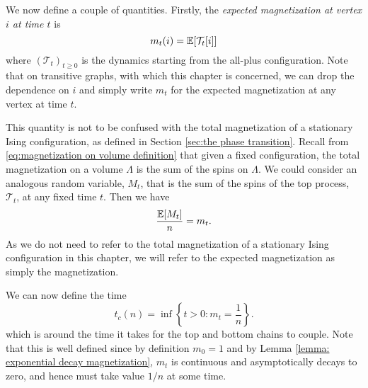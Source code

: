 We now define a couple of quantities. 
%
%
Firstly, the \emph{expected magnetization at vertex $i$ at time $t$} is
\begin{equation}
	 	m_t(i) = \mathbb{E}[\mathcal{T}_t[i]]
\end{equation} 
where $(\mathcal{T}_t)_{t \geq 0}$ is the dynamics starting from the all-plus configuration. Note that on transitive graphs, with which this chapter is concerned, we can drop the dependence on $i$ and simply write $m_t$ for the expected magnetization at any vertex at time $t$. 

This quantity is not to be confused with the total magnetization of a stationary Ising configuration, as defined in Section \ref{sec:the phase transition}. Recall from \eqref{eq:magnetization on volume definition} that given a fixed configuration, the total magnetization on a volume $\Lambda$ is the sum of the spins on $\Lambda$. We could consider an analogous random variable, $M_t$, that is the sum of the spins of the top process, $\mathcal{T}_t$, at any fixed time $t$. Then we have
\begin{equation}
	\frac{\mathbb{E}[M_t]}{n} = m_t.
\end{equation}
As we do not need to refer to the total magnetization of a stationary Ising configuration in this chapter, we will refer to the expected magnetization as simply the magnetization.


We can now define the time
\begin{equation}
	\label{eq:definition t_c(n)}
	t_c(n) = \inf\left\{ t > 0 : m_t = \frac{1}{n}\right\}.
\end{equation}
which is around the time it takes for the top and bottom chains to couple. Note that this is well defined since by definition $m_0 = 1$ and by Lemma \ref{lemma: exponential decay magnetization}, $m_t$ is continuous and asymptotically decays to zero, and hence must take value $1/n$ at some time.


